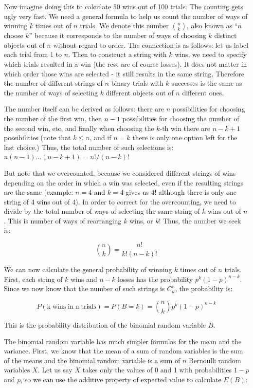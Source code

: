 \documentclass[
]{book}
\theoremstyle{definition}
\theoremstyle{definition}
\theoremstyle{definition}
\theoremstyle{remark}
\begin{document}
Now imagine doing this to calculate 50 wins out of 100 trials. The counting gets ugly very fast. We need a general formula to help us count the number of ways of winning \(k\) times out of \(n\) trials. We denote this number \(\binom{n}{k}\), also known as ``\(n\) choose \(k\)'' because it corresponds to the number of ways of choosing \(k\) distinct objects out of \(n\) without regard to order. The connection is as follows: let us label each trial from 1 to \(n\). Then to construct a string with \(k\) wins, we need to specify which trials resulted in a win (the rest are of course losses). It does not matter in which order those wins are selected - it still results in the same string. Therefore the number of different strings of \(n\) binary trials with \(k\) successes is the same as the number of ways of selecting \(k\) different objects out of \(n\) different ones.

The number itself can be derived as follows: there are \(n\) possibilities for choosing the number of the first win, then \(n-1\) possibilities for choosing the number of the second win, etc, and finally when choosing the \(k\)-th win there are \(n-k+1\) possibilities (note that \(k \leq n\), and if \(n=k\) there is only one option left for the last choice.) Thus, the total number of such selections is: \(n(n-1)...(n-k+1) = n!/(n-k)!\)

But note that we overcounted, because we considered different strings of wins depending on the order in which a win was selected, even if the resulting strings are the same (example: \(n=4\) and \(k=4\) gives us \(4!\) although there is only one string of 4 wins out of 4). In order to correct for the overcounting, we need to divide by the total number of ways of selecting the same string of \(k\) wins out of \(n\). This is number of ways of rearranging \(k\) wins, or \(k!\) Thus, the number we seek is:

\[\binom{n}{k} = \frac{n!}{k! (n-k)!}\]

We can now calculate the general probability of winning \(k\) times out of \(n\) trials. First, each string of \(k\) wins and \(n-k\) losses has the probability \(p^k (1-p)^{n-k}\). Since we now know that the number of such strings is \(C^n_k\), the probability is:

\[
 P(\mathrm{k \; wins \; in \; n \; trials}) =  P(B=k)= \binom{n}{k}  p^k (1-p)^{n-k}
\]

This is the probability distribution of the binomial random variable \(B\).

The binomial random variable has much simpler formulas for the mean and the variance. First, we know that the mean of a sum of random variables is the sum of the means and the binomial random variable is a sum of \(n\) Bernoulli random variables \(X\). Let us say \(X\) takes only the values of 0 and 1 with probabilities \(1-p\) and \(p\), so we can use the additive property of expected value to calculate \(E(B)\):
\end{document}

